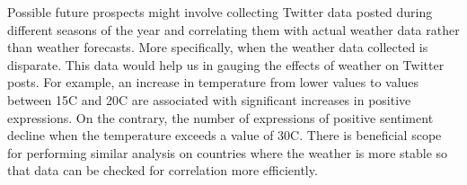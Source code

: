 \documentclass[a4paper,10pt]{article}
\begin{document}
     Possible future prospects might involve collecting Twitter data posted during different seasons of the year and correlating them with actual weather data rather than weather forecasts. More specifically, when the weather data collected is disparate. This data would help us in gauging the effects of weather on Twitter posts.  For example, an increase in temperature from lower values to values between 15C and 20C are associated with significant increases in positive expressions. On the contrary, the number of expressions of positive sentiment decline when the temperature exceeds a value of 30C. There is beneficial scope for performing similar analysis on countries where the weather is more stable so that data can be checked for correlation more efficiently.

    \printbibliography
\end{document}
